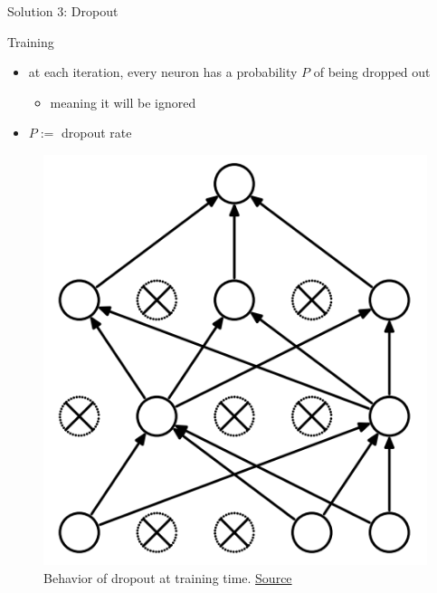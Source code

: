 \begin{frame}{Solution 3: Dropout}
	\begin{block}{Training}
		\begin{itemize}
			\item at each iteration, every neuron has a probability $P$ of being dropped out
			\begin{itemize}
				\item meaning it will be ignored
			\end{itemize}
			\item $P :=$ dropout rate
		\end{itemize}
		
		\begin{figure}[H]
			\centering
			\includegraphics[height=0.4\textheight]{Figs/Dropout-after.png}
			\caption{Behavior of dropout at training time. \href{https://www.cs.toronto.edu/~hinton/absps/JMLRdropout.pdf}{Source}}
		\end{figure}
	\end{block}
\end{frame}
